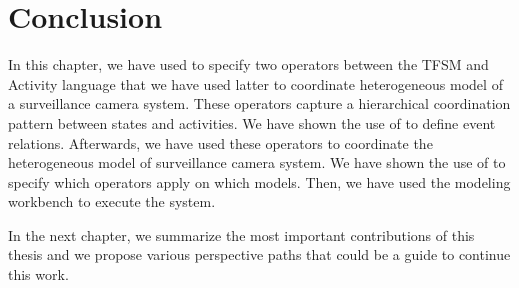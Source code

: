 \section{Conclusion}
In this chapter, we have used \bcool to specify two operators between the TFSM and Activity language that we have used latter to coordinate heterogeneous model of a surveillance camera system. These operators capture a hierarchical coordination pattern between states and activities. We have shown the use of \moccml to define event relations. Afterwards, we have used these operators to coordinate the heterogeneous model of surveillance camera system. We have shown the use of \bflow to specify which operators apply on which models. Then, we have used the modeling workbench to execute the system. 

In the next chapter, we summarize the most important contributions of this thesis and we propose various perspective paths that could be a guide to continue this work. 

 
